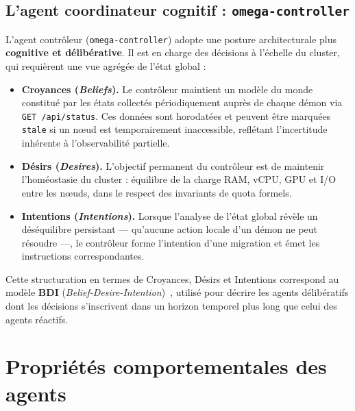 \subsection{L'agent coordinateur cognitif : \texttt{omega-controller}}
\label{subsec:sma-controller}

L'agent contrôleur (\texttt{omega-controller}) adopte une posture architecturale plus \textbf{cognitive et délibérative}. Il est en charge des décisions à l'échelle du cluster, qui requièrent une vue agrégée de l'état global :

\begin{itemize}
    \item \textbf{Croyances (\textit{Beliefs}).} Le contrôleur maintient un modèle du monde constitué par les états collectés périodiquement auprès de chaque démon via \texttt{GET /api/status}. Ces données sont horodatées et peuvent être marquées \texttt{stale} si un nœud est temporairement inaccessible, reflétant l'incertitude inhérente à l'observabilité partielle.
    \item \textbf{Désirs (\textit{Desires}).} L'objectif permanent du contrôleur est de maintenir l'homéostasie du cluster : équilibre de la charge RAM, vCPU, GPU et I/O entre les nœuds, dans le respect des invariants de quota formels.
    \item \textbf{Intentions (\textit{Intentions}).} Lorsque l'analyse de l'état global révèle un déséquilibre persistant — qu'aucune action locale d'un démon ne peut résoudre —, le contrôleur forme l'intention d'une migration et émet les instructions correspondantes.
\end{itemize}

Cette structuration en termes de Croyances, Désirs et Intentions correspond au modèle \textbf{BDI} (\textit{Belief-Desire-Intention})~\cite{wooldridge_2002_sma}, utilisé pour décrire les agents délibératifs dont les décisions s'inscrivent dans un horizon temporel plus long que celui des agents réactifs.

\section{Propriétés comportementales des agents}
\label{sec:sma-proprietes}

